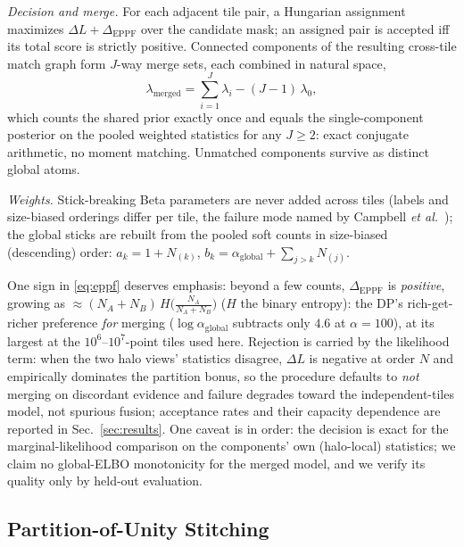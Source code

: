 \emph{Decision and merge.} For each adjacent tile pair, a Hungarian
assignment~\cite{kuhn1955hungarian} maximizes $\Delta L + \Delta_{\mathrm{EPPF}}$ over the
candidate mask; an assigned pair is accepted iff its total score is
strictly positive. Connected components of the resulting cross-tile match
graph form $J$-way merge sets, each combined in natural space,
\begin{equation}
\lambda_{\mathrm{merged}} = \sum_{i=1}^{J} \lambda_i - (J - 1)\,\lambda_0,
\label{eq:merge}
\end{equation}
which counts the shared prior exactly once and equals the
single-component posterior on the pooled weighted statistics for any
$J \ge 2$: exact conjugate arithmetic, no moment matching.
Unmatched components survive as distinct global atoms.

\emph{Weights.} Stick-breaking Beta parameters are never added across
tiles (labels and size-biased orderings differ per tile, the failure
mode named by Campbell \emph{et al.}~\cite{campbell2015streaming});
the global sticks are rebuilt from the pooled soft counts in
size-biased (descending) order: $a_k = 1 + N_{(k)}$,
$b_k = \alpha_{\mathrm{global}} + \sum_{j > k} N_{(j)}$.

 One sign in \eqref{eq:eppf} deserves emphasis: beyond a few counts,
$\Delta_{\mathrm{EPPF}}$ is \emph{positive}, growing as
${\approx}(N_A{+}N_B)\,H\!\big(\tfrac{N_A}{N_A+N_B}\big)$ ($H$ the
binary entropy): the DP's rich-get-richer preference \emph{for}
merging ($\log\alpha_{\mathrm{global}}$ subtracts only $4.6$ at
$\alpha{=}100$), at its largest at the $10^6$--$10^7$-point tiles used
here.
Rejection is carried by the likelihood term: when the two
halo views' statistics disagree, $\Delta L$ is negative at order $N$
and empirically dominates the partition bonus, so the procedure
defaults to \emph{not} merging on discordant evidence and failure
degrades toward the independent-tiles model, not spurious fusion;
acceptance rates and their capacity dependence are reported in
Sec.~\ref{sec:results}. One caveat is in order: the decision
is exact for the marginal-likelihood comparison on the components' own
(halo-local) statistics; we claim no global-ELBO monotonicity for the
merged model, and we verify its quality only by held-out evaluation.

\subsection{Partition-of-Unity Stitching}
\label{sec:stitch}

